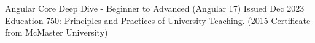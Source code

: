 

\begin{cvparagraph}
\begin{center}
	Angular Core Deep Dive - Beginner to Advanced (Angular 17) Issued Dec 2023\\
	Education 750: Principles and Practices of University Teaching. (2015 Certificate from McMaster University)
\end{center}%
\end{cvparagraph}